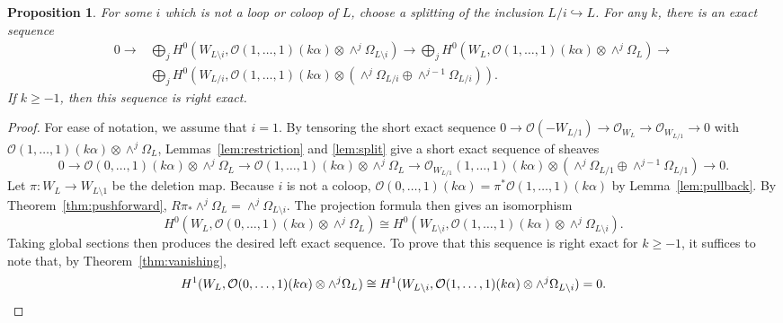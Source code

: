 \documentclass{amsart}
\newtheorem{proposition}[theorem]{Proposition}
\theoremstyle{definition}
\begin{document}
\begin{proposition}\label{prop:exactsuperspace}
For some $i$ which is not a loop or coloop of $L$, choose a splitting of the inclusion $L/i \hookrightarrow L$.
For any $k$, there is an exact sequence
\begin{equation*}\begin{split}
0 \to & \bigoplus_j H^0(W_{L \setminus i}, \mathcal{O}(1, \dotsc, 1)(k\alpha) \otimes \wedge^j \Omega_{L \setminus i}) \to \bigoplus_j H^0(W_L, \mathcal{O}(1, \dotsc, 1)(k\alpha) \otimes \wedge^j \Omega_L) \to \\ 
 &\bigoplus_j H^0(W_{L/i}, \mathcal{O}(1, \dotsc, 1)(k\alpha) \otimes (\wedge^j \Omega_{L/i} \oplus \wedge^{j-1} \Omega_{L/i})).
\end{split}\end{equation*}
If $k  \ge -1$, then this sequence is right exact. 
\end{proposition}


\begin{proof}
For ease of notation, we assume that $i = 1$. 
By tensoring the short exact sequence $0 \to \mathcal{O}(-W_{L/1}) \to \mathcal{O}_{W_L} \to \mathcal{O}_{W_{L/1}} \to 0$ with $\mathcal{O}(1, \dotsc, 1)(k\alpha) \otimes \wedge^j \Omega_L$, Lemmas~\ref{lem:restriction} and \ref{lem:split} give a short exact sequence of sheaves
$$0 \to \mathcal{O}(0, \dotsc, 1)(k \alpha) \otimes \wedge^j \Omega_L \to \mathcal{O}(1, \dotsc, 1)(k \alpha) \otimes \wedge^j \Omega_L \to \mathcal{O}_{W_{L/1}}(1, \dotsc, 1)(k\alpha) \otimes (\wedge^j \Omega_{L/1} \oplus \wedge^{j-1}\Omega_{L/1}) \to 0.$$
Let $\pi \colon W_L \to W_{L \setminus 1}$ be the deletion map. 
Because $i$ is not a coloop, $\mathcal{O}(0, \dotsc, 1)(k\alpha) = \pi^* \mathcal{O}(1, \dotsc, 1)(k\alpha)$ by Lemma~\ref{lem:pullback}. By Theorem~\ref{thm:pushforward}, $R \pi_* \wedge^j \Omega_L = \wedge^j \Omega_{L \setminus i}$. The projection formula then gives an isomorphism
\begin{equation}\label{eq:projdel}
H^0(W_L, \mathcal{O}(0, \dotsc, 1)(k\alpha) \otimes \wedge^j \Omega_L) \cong H^0(W_{L \setminus i}, \mathcal{O}(1, \dotsc, 1)(k\alpha) \otimes \wedge^j \Omega_{L \setminus i}).
\end{equation}
Taking global sections then produces the desired left exact sequence. To prove that this sequence is right exact for $k \ge -1$, it suffices to note that, by Theorem~\ref{thm:vanishing}, 
\begin{equation*}
H^1(W_L, \mathcal{O}(0, \dotsc, 1)(k\alpha) \otimes \wedge^j \Omega_L) \cong H^1(W_{L \setminus i}, \mathcal{O}(1, \dotsc, 1)(k\alpha) \otimes \wedge^j \Omega_{L \setminus i}) = 0. \qedhere
\end{equation*}
\end{proof}
\end{document}
